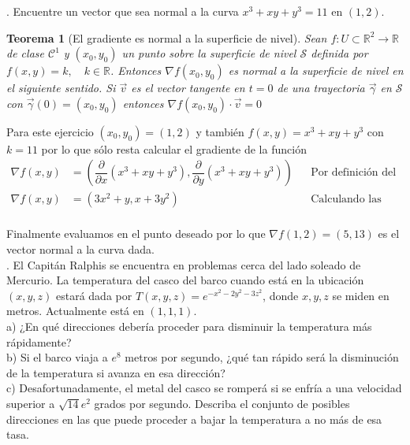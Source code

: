 \documentclass[letterpaper]{article}
\renewcommand{\d}{\partial}
\newcommand{\R}{\mathds{R}}
\renewcommand{\*}{\cdot}
\newtheorem{theorem}{Teorema}[]
\theoremstyle{definition}
\begin{document}
. Encuentre un vector que sea normal a la curva $x^3 + xy + y^3 = 11$ en  $(1,2)$.\\

\begin{theorem}[El gradiente es  normal a la superficie de nivel]
	Sean $ f: U \subset \R^2 \to \R $ de clase $ \mathscr{C}^1 $ y $ (x_0, y_0) $ un punto sobre la superficie de nivel $\mathcal{S}  $ definida por $ f(x,y) = k, \quad k \in \R $. Entonces $ \nabla f(x_0, y_0) $ es normal a la superficie de nivel en el siguiente sentido. Si $ \vec{v} $ es el vector tangente en $ t = 0 $ de una trayectoria $ \vec{\gamma} $ en $ \mathcal{S} $ con $ \vec{\gamma}(0) = (x_0,y_0) $ entonces $ \nabla f(x_0,y_0) \* \vec{v} = 0 $
\end{theorem}

Para este ejercicio $ (x_0,y_0) = (1,2) $ y también $ f(x,y) = x^3+xy+y^3 $ con $ k = 11 $ por lo que sólo resta calcular el gradiente de la función 
\begin{align*}
	\nabla f(x,y) &= \left(\dfrac{\d}{\d x} (x^3+xy+y^3) , \dfrac{\d}{\d y} (x^3+xy+y^3)\right) && \text{Por definición del gradiente}\\
	\nabla f(x,y) &= \left(3x^2 + y , x+3y^2 \right) && \text{Calculando las parciales}\\
\end{align*}

Finalmente evaluamos en el punto deseado por lo que $ \nabla f(1,2) = (5,13) $ es el vector normal a la curva dada.\\

.  El Capitán Ralphis se encuentra en problemas cerca del lado soleado de Mercurio. La temperatura del casco del barco cuando está en la ubicación $(x, y, z)$ estará dada por $T(x,y,z) = e^{-x^2 - 2y^2 - 3z^2}$, donde $x,y,z$ se miden en metros. Actualmente está en $(1,1,1)$.\\

a) ¿En qué direcciones debería proceder para disminuir la temperatura más rápidamente?\\

b) Si el barco viaja a $e^8$ metros por segundo, ¿qué tan rápido será la disminución de la temperatura si avanza en esa dirección?\\

c) Desafortunadamente, el metal del casco se romperá si se enfría a una velocidad superior a $\sqrt{14}e^2$ grados por segundo. Describa el conjunto de posibles direcciones en las que puede proceder a bajar la temperatura a no más de esa tasa.\\
\end{document}
